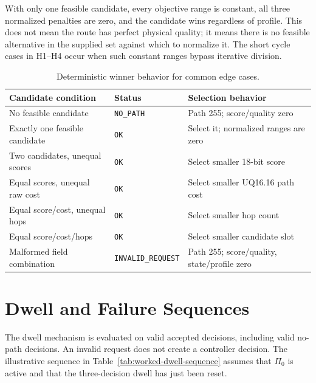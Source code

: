 With only one feasible candidate, every objective range is constant, all three
normalized penalties are zero, and the candidate wins regardless of profile. This
does not mean the route has perfect physical quality; it means there is no feasible
alternative in the supplied set against which to normalize it. The short cycle
cases in H1--H4 occur when such constant ranges bypass iterative division.

\begin{table}[H]
\centering
\caption{Deterministic winner behavior for common edge cases.}
\label{tab:worked-winner-cases}
\begin{tabularx}{\textwidth}{@{}p{}p{}X@{}}
\toprule
\textbf{Candidate condition} & \textbf{Status} & \textbf{Selection behavior}\\
\midrule
No feasible candidate & \texttt{NO\_PATH} & Path 255; score/quality zero\\
Exactly one feasible candidate & \texttt{OK} & Select it; normalized ranges are zero\\
Two candidates, unequal scores & \texttt{OK} & Select smaller 18-bit score\\
Equal scores, unequal raw cost & \texttt{OK} & Select smaller UQ16.16 path cost\\
Equal score/cost, unequal hops & \texttt{OK} & Select smaller hop count\\
Equal score/cost/hops & \texttt{OK} & Select smaller candidate slot\\
Malformed field combination & \texttt{INVALID\_REQUEST} & Path 255; score/quality,
state/profile zero\\
\bottomrule
\end{tabularx}
\end{table}

\section{Dwell and Failure Sequences}

The dwell mechanism is evaluated on valid accepted decisions, including valid
no-path decisions. An invalid request does not create a controller decision. The
illustrative sequence in Table~\ref{tab:worked-dwell-sequence} assumes that $\Pi_0$
is active and that the three-decision dwell has just been reset.

